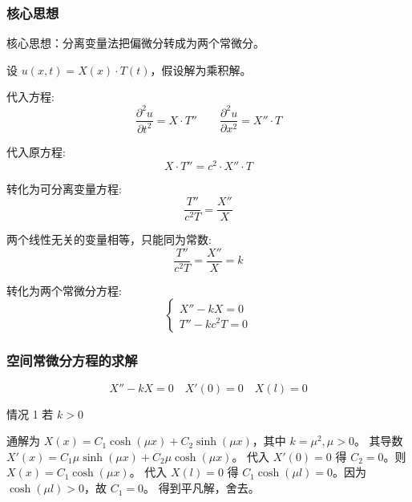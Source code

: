 \documentclass[12pt,a4paper]{article}
\numberwithin{subsection}{section}   %
\numberwithin{subsubsection}{subsection}
\theoremstyle{plain}
\theoremstyle{definition}
\theoremstyle{remark}
\theoremstyle{remark}
\begin{document}
	\subsubsection{核心思想}
	核心思想：分离变量法把偏微分转成为两个常微分。
	
	设 \(u(x, t) = X(x) \cdot T(t)\)，假设解为乘积解。
	
	代入方程:
	\begin{equation} \label{eq:substitution_mixed2}
		\frac{\partial^2 u}{\partial t^2} = X \cdot T'' \qquad \frac{\partial^2 u}{\partial x^2} = X'' \cdot T
	\end{equation}
	
	代入原方程:
	\begin{equation} \label{eq:original_substitution_mixed2}
		X \cdot T'' = c^2 \cdot X'' \cdot T
	\end{equation}
	
	转化为可分离变量方程:
	\begin{equation} \label{eq:separation_mixed2}
		\frac{T''}{c^2 T} = \frac{X''}{X}
	\end{equation}
	
	两个线性无关的变量相等，只能同为常数:
	\begin{equation} \label{eq:constant_mixed2}
		\frac{T''}{c^2 T} = \frac{X''}{X} = k
	\end{equation}
	
	转化为两个常微分方程:
	\begin{equation} \label{eq:ode_mixed2}
		\begin{cases}
			X'' - kX = 0 \\
			T'' - k c^2 T = 0
		\end{cases}
	\end{equation}
	
	\subsubsection{空间常微分方程的求解}
	\begin{equation}
		X'' - kX = 0 \quad X'(0) = 0 \quad X(l) = 0
	\end{equation}
	
	情况 1 \quad 若 \(k > 0\)
	
	通解为 \(X(x) = C_1 \cosh(\mu x) + C_2 \sinh(\mu x)\)，其中 \(k = \mu^2, \mu>0\)。
	其导数 $X'(x) = C_1 \mu \sinh(\mu x) + C_2 \mu \cosh(\mu x)$。
	代入 $X'(0)=0$ 得 $C_2=0$。则 $X(x) = C_1 \cosh(\mu x)$。
	代入 $X(l)=0$ 得 $C_1 \cosh(\mu l) = 0$。因为 $\cosh(\mu l)>0$，故 $C_1=0$。
	得到平凡解，舍去。
	
\end{document}

